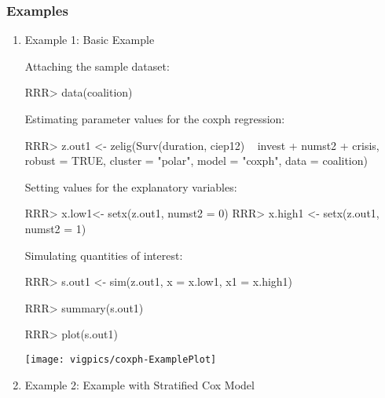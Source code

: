 \subsubsection{Examples}
\begin{enumerate}
\item {Example 1: Basic Example}

Attaching the sample dataset:
\begin{Schunk}
\begin{Sinput}
RRR> data(coalition)
\end{Sinput}
\end{Schunk}
Estimating parameter values for the coxph regression:
\begin{Schunk}
\begin{Sinput}
RRR> z.out1 <- zelig(Surv(duration, ciep12) ~ invest + numst2 + crisis, robust = TRUE, cluster = "polar", model = "coxph", data = coalition)
\end{Sinput}
\end{Schunk}
Setting values for the explanatory variables:
\begin{Schunk}
\begin{Sinput}
RRR> x.low1<- setx(z.out1, numst2 = 0)
RRR> x.high1 <- setx(z.out1, numst2 = 1)
\end{Sinput}
\end{Schunk}
Simulating quantities of interest:
\begin{Schunk}
\begin{Sinput}
RRR> s.out1 <- sim(z.out1, x = x.low1, x1 = x.high1)
\end{Sinput}
\end{Schunk}
\begin{Schunk}
\begin{Sinput}
RRR> summary(s.out1)
\end{Sinput}
\end{Schunk}
\begin{center}
\begin{Schunk}
\begin{Sinput}
RRR> plot(s.out1)
\end{Sinput}
\end{Schunk}
\texttt{[image: vigpics/coxph-ExamplePlot]}
\end{center}

\item {Example 2: Example with Stratified Cox Model}


\end{enumerate}
